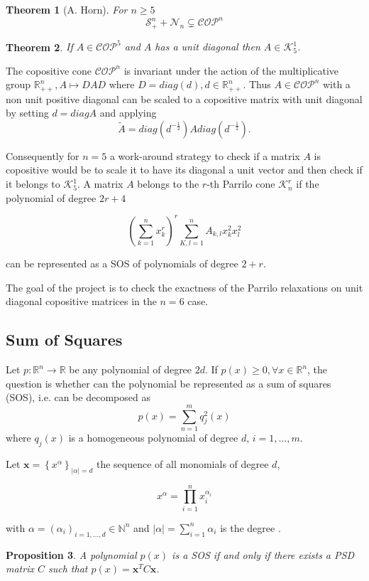 \documentclass[onecolumn,11pt,a4paper]{article}
\theoremstyle{plain}  %
\newtheorem{theorem}{Theorem}[section]
\newtheorem{proposition}[theorem]{Proposition}
\theoremstyle{remark}  %
\begin{document}
\begin{theorem}[A. Horn]
	For $n \ge 5$
	\[
		 \mathcal{S}_+^n + \mathcal{N}_n \subsetneq \mathcal{COP}^n
	\]
\end{theorem}

\begin{theorem}
	If $A \in \mathcal{COP}^5$ and $A$ has a unit diagonal then $A \in
	\mathcal{K}_5^1$.
\end{theorem}

The copositive cone $\mathcal{COP}^n$ is invariant under the action of the
multiplicative group $\mathbb{R}^n_{++}, A \mapsto D A D$ where $D = diag(d), d
\in \mathbb{R}^n_{++}$. Thus $A \in \mathcal{COP}^n$ with a non unit positive diagonal can be scaled to a copositive matrix with unit diagonal by setting
$d = diag A$ and applying 
\[
	\tilde{A} = diag\left( d^{-\frac{1}{2}} \right) A diag\left( d^{-\frac{1}{2}}
	\right).
\]

Consequently for $n = 5$ a work-around strategy to check if a matrix $A$ is copositive would
be to scale it to have its diagonal a unit vector and then check if it belongs
to $\mathcal{K}_5^1$. A matrix $A$ belongs to the $r$-th Parrilo cone $\mathcal{K}_n^r$ if the
polynomial of degree $2r + 4$ 

\[
	\left( \sum_{k = 1}^n x^r_k  \right)^r \sum_{K, l = 1}^n A_{k,l} x^2_k x^2_l 
\]

can be represented as a SOS of polynomials of degree $2 + r$.

The goal of the project is to check the exactness of the Parrilo relaxations on
unit diagonal copositive matrices in the $n = 6$ case.

\subsection{Sum of Squares}
\label{sos}
\label{sub:definition}
Let $p: \mathbb{R}^n \rightarrow   \mathbb{R} $ be  any polynomial of degree $2d$. If $p(x)
\geq 0 , \forall x \in \mathbb{R}^n $,  the question is whether can the
polynomial be represented as a sum of squares (SOS), i.e. can be decomposed as 
\[  p(x) =  \sum_{n=1}^m q^{2}_j(x)\] 
where $q_j(x)$ is a homogeneous polynomial of degree $d$, $i = 1,\ldots,m$. 

Let $\mathbf{x} = \left\{ x^\alpha \right\}_{ |\alpha| = d }$ the sequence of all
monomials of degree $d$,

\[ x^\alpha = \prod_{i = 1}^n x_i^{\alpha_i} \]

with $\alpha = \left(
	\alpha_i \right)_{i = 1,\ldots,d} \in \mathbb{N}^n$  and $| \alpha | =
	\sum_{i = 1}^n \alpha_i $ is the degree . 
\begin{proposition}
	A polynomial $p(x)$ is a SOS if and only if there exists a PSD matrix $C$ such
	that $p(x) = \mathbf{x}^T C \mathbf{x}$.
\end{proposition}
	
\end{document}
